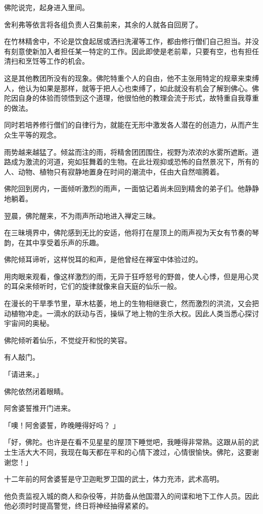 \documentclass[twoside,openany]{book}
\begin{document}
佛陀说完，起身进入里间。

舍利弗等依言将各组负责人召集前来，其余的人就各自回房了。

在竹林精舍中，不论是饮食起居或洒扫洗濯等工作，都由修行僧们自己担当。并没有刻意使新加入者担任某一特定的工作。因此即使是老前辈，只要有空，也有担任清扫和烹饪等工作的机会。

这是其他教团所没有的现象。佛陀特重个人的自由，他不主张用特定的规章来束缚人，他认为如果是那样，就等于把人心也束缚了，如此就没有机会了解到佛心。佛陀因自身的体验而领悟到这个道理，他很怕他的教理会流于形式，故特重自我尊重的做法。

同时若培养修行僧们的自律行为，就能在无形中激发各人潜在的创造力，从而产生众生平等的观念。

雨势越来越猛了。倾盆而注的雨，将精舍团团围住，视野为浓浓的水雾所遮断。道路成为激流的河道，宛如狂舞着的生物。在此壮观抑或恐怖的自然景况下，所有的人、动物、植物只有寂静地置身在时间的潮流中，任由大自然喧腾着。

佛陀回到房内，一面倾听激烈的雨声，一面惦记着尚未回到精舍的弟子们。他静静地躺着。

翌晨，佛陀醒来，不为雨声所动地进入禅定三昧。

在三昧境界中，佛陀感到无比的安适，他将打在屋顶上的雨声视为天女有节奏的琴韵，在其中享受着乐声的乐趣。

佛陀倾耳谛听，这样悦耳的和声，是他曾经在禅室中体验过的。

用肉眼来观看，像这样激烈的雨，无异于狂呼怒号的野兽，使人心悸，但是用心灵的耳朵来倾听时，它们的旋律就像来自天庭的仙乐一般。

在漫长的干旱季节里，草木枯萎，地上的生物相继衰亡，然而激烈的洪流，又会把动植物冲走。一滴水的跃动与否，操纵了地上物的生杀大权。因此人类当悉心探讨宇宙间的奥秘。

佛陀倾听着仙乐，不觉绽开和悦的笑容。

有人敲门。

「请进来。」

佛陀依然闭着眼睛。

阿舍婆誓推开门进来。

「噢！阿舍婆誓，昨晚睡得好吗？	」

「好，佛陀。也许是在看不见星星的屋顶下睡觉吧，我睡得非常熟。这跟从前的武士生活大大不同，我现在每天都在平和的心情下渡过，心情很愉快。佛陀，这要谢谢您！」

十二年前的阿舍婆誓是守卫迦毗罗卫国的武士，体力充沛，武术高明。

他负责监视入城的商人和杂役等，并防备从他国潜入的间谍和地下工作人员。因此他必须时时提高警觉，终日将神经抽得紧紧的。
\end{document}
